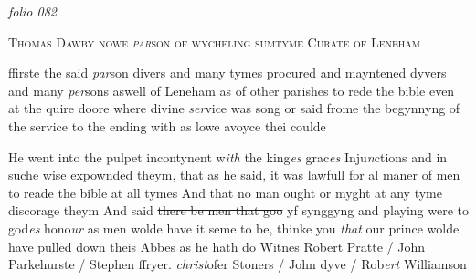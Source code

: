 \documentclass[12pt, a4paper]{book}
\begin{document}
            
\dotfill
					

\textit{folio 082}


            
               
				\begin{center} \begin{large} {\scshape Thomas Dawby nowe \textit{par}son of wycheling
               	sumtyme Curate of Leneham} \end{large} \end{center}
			

 
 	
			
 	
				\marginpar[\vspace{0.5cm}{\textcolor{Gray}{seditious}}]{}
			
 	
		\ifthenelse{\isodd{\thepage}}
		{\reversemarginpar}
		{\normalmarginpar}
		 ffirste the said \textit{par}son divers and many tymes procured and
 		mayntened dyvers and many \textit{per}sons aswell of Leneham as of
  other parishes to rede the bible even at the quire doore where
 divine \textit{ser}vice was song or said frome the begynnyng of the
 service to the ending with as lowe avoyce thei coulde
 

	
				\marginpar[\vspace{0.5cm}{\textcolor{Gray}{seditious}}]{}
			
	
		\ifthenelse{\isodd{\thepage}}
		{\reversemarginpar}
		{\normalmarginpar}
		He went into the pulpet incontynent w\textit{ith} the king\textit{es} grac\textit{es} Inju\textit{n}ctions
 and in suche wise expownded theym, that as he said, it was
 lawfull for al maner of men to reade the bible at all tymes
 And that no man ought or myght at any tyme discorage theym
 And said \sout{there be men that goo} yf synggyng and playing were
 to god\textit{es} hono\textit{ur} as men wolde have it seme to be, thinke you \textit{that}
 our prince wolde have pulled down theis Abbes as he hath do
 Witnes Robert Pratte / John Parkehurste / Stephen
 	ffryer. \textit{christ}ofer Stoners / John dyve / Rob\textit{ert} Williamson
 
				\marginpar[\vspace{0.5cm}{\textcolor{Gray}{aesno anno}}]{}
			
            	
				\marginpar[\vspace{0.5cm}{\textcolor{Gray}{vi articles}}]{}
			
\end{document}
